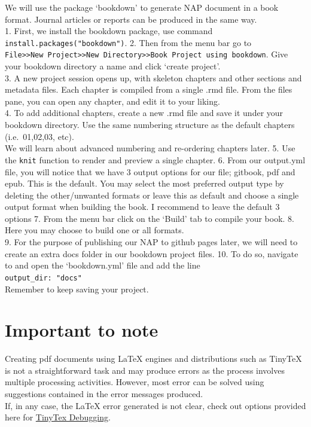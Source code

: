 \documentclass[
]{book}
\begin{document}
We will use the package `bookdown' to generate NAP document in a book format. Journal articles or reports can be produced in the same way.\\
1. First, we install the bookdown package, use command \texttt{install.packages("bookdown")}.
2. Then from the menu bar go to \texttt{File\textgreater{}\textgreater{}New\ Project\textgreater{}\textgreater{}New\ Directory\textgreater{}\textgreater{}Book\ Project\ using\ bookdown}. Give your bookdown directory a name and click `create project'.\\
3. A new project session opens up, with skeleton chapters and other sections and metadata files. Each chapter is compiled from a single .rmd file. From the files pane, you can open any chapter, and edit it to your liking.\\
4. To add additional chapters, create a new .rmd file and save it under your bookdown directory. Use the same numbering structure as the default chapters (i.e.~01,02,03, etc).\\
We will learn about advanced numbering and re-ordering chapters later.
5. Use the \texttt{knit} function to render and preview a single chapter.
6. From our output.yml file, you will notice that we have 3 output options for our file; gitbook, pdf and epub. This is the default. You may select the most preferred output type by deleting the other/unwanted formats or leave this as default and choose a single output format when building the book. I recommend to leave the default 3 options
7. From the menu bar click on the `Build' tab to compile your book.
8. Here you may choose to build one or all formats.\\
9. For the purpose of publishing our NAP to github pages later, we will need to create an extra docs folder in our bookdown project files.
10. To do so, navigate to and open the `bookdown.yml' file and add the line\\
\texttt{output\_dir:\ "docs"}~\\
Remember to keep saving your project.

\hypertarget{important-to-note}{%
\section{Important to note}\label{important-to-note}}

Creating pdf documents using LaTeX engines and distributions such as TinyTeX is not a straightforward task and may produce errors as the process involves multiple processing activities. However, most error can be solved using suggestions contained in the error messages produced.\\
If, in any case, the LaTeX error generated is not clear, check out options provided here for \href{https://yihui.org/tinytex/r/}{TinyTex Debugging}.
\end{document}
